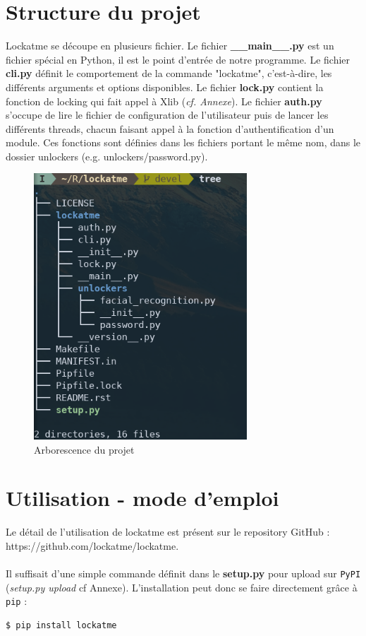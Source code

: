 \documentclass[french]{report}
\begin{document}
\section{Structure du projet}
Lockatme se découpe en plusieurs fichier. Le fichier \textbf{\_\_main\_\_.py} est un fichier
spécial en Python, il est le point d'entrée de notre programme. Le fichier \textbf{cli.py}
définit le comportement de la commande "lockatme", c'est-à-dire, les différents
arguments et options disponibles.
Le fichier \textbf{lock.py} contient la fonction de locking qui fait appel à Xlib (\emph{cf. Annexe}).
Le fichier \textbf{auth.py} s'occupe de lire le fichier de configuration de l'utilisateur
puis de lancer les différents threads, chacun faisant appel à la fonction
d'authentification d'un module. Ces fonctions sont définies dans les
fichiers portant le même nom, dans le dossier unlockers (e.g. unlockers/password.py).

\begin{figure}[h]\label{fig:tree}
\begin{center}
  \includegraphics[width=80mm,scale=0.5]{tree}
\end{center}
  \caption{Arborescence du projet}
  \label{fig:tree}
\end{figure}

\section{Utilisation - mode d'emploi}
Le détail de l'utilisation de lockatme est présent sur le repository GitHub :\\
https://github.com/lockatme/lockatme.\\\\
Il suffisait d'une simple commande définit dans le \textbf{setup.py} pour
upload sur \texttt{PyPI} (\emph{setup.py upload} cf Annexe).
L'installation peut donc se faire directement grâce à \texttt{pip} :
\begin{lstlisting}[language=bash]
  $ pip install lockatme
\end{lstlisting}
\end{document}
